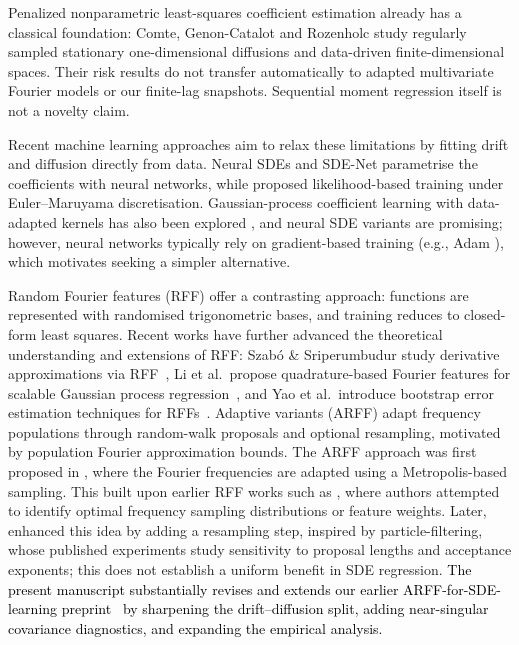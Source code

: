 \documentclass{article}
\begin{document}
Penalized nonparametric least-squares coefficient estimation already has a classical foundation: Comte, Genon-Catalot and Rozenholc \citep{Comte2007} study regularly sampled stationary one-dimensional diffusions and data-driven finite-dimensional spaces. Their risk results do not transfer automatically to adapted multivariate Fourier models or our finite-lag snapshots. Sequential moment regression itself is not a novelty claim.

Recent machine learning approaches aim to relax these limitations by fitting drift and diffusion directly from data.
Neural SDEs \cite{neural_SDEs} and SDE-Net \cite{SDE_Net} parametrise the coefficients with neural networks, while \cite{Dietrich2023,dridi2021learningstochasticdynamicalsystems} proposed likelihood-based training under Euler--Maruyama discretisation.
Gaussian-process coefficient learning with data-adapted kernels has also been explored \cite{Darcy2023}, and neural SDE variants \cite{neural_SDEs,SDE_Net,Dietrich2023,dridi2021learningstochasticdynamicalsystems} are promising; however, neural networks typically rely on gradient-based training (e.g., Adam \citep{kingma2017adammethodstochasticoptimization}), which motivates seeking a simpler alternative.

Random Fourier features (RFF) \cite{RR2007RandomFF,Li2021UnifiedRFF} offer a contrasting approach:
functions are represented with randomised trigonometric bases, and training reduces to closed-form least squares.
Recent works have further advanced the theoretical understanding and extensions of RFF:
Szabó \& Sriperumbudur study derivative approximations via RFF~\citep{pmlr-v89-szabo19a},
Li et al.\ propose quadrature-based Fourier features for scalable Gaussian process regression~\citep{pmlr-v238-li24o},
and Yao et al.\ introduce bootstrap error estimation techniques for RFFs~\citep{pmlr-v206-yao23a}.
Adaptive variants (ARFF) \cite{kammonen2020adaptiverandomfourierfeatures,Kammonen2025Adaptive,huang2025convergenceadaptiveresamplingrandom}
adapt frequency populations through random-walk proposals and optional resampling, motivated by population Fourier approximation bounds. The ARFF approach was first proposed in \cite{kammonen2020adaptiverandomfourierfeatures}, where the Fourier frequencies are adapted using a Metropolis-based sampling. This built upon earlier RFF works such as  \cite{RR2007RandomFF, NIPS2008RR, Barron1993, Barron1994}, where authors attempted to identify optimal frequency sampling distributions or feature weights. Later, \cite{Kammonen2025Adaptive} enhanced this idea by adding a resampling step, inspired by particle-filtering, whose published experiments study sensitivity to proposal lengths and acceptance exponents; this does not establish a uniform benefit in SDE regression.
 \textcolor{black}{The present manuscript substantially revises and extends our earlier ARFF-for-SDE-learning preprint~\cite{douglas2025arffsde} by sharpening the drift–diffusion split, adding near-singular covariance diagnostics, and expanding the empirical analysis.}
\end{document}
